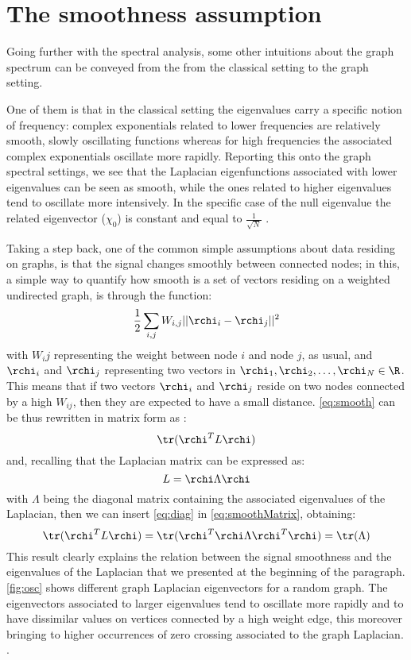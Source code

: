 \chapter{The smoothness assumption}
Going further with the spectral analysis, some other intuitions about the graph spectrum can be conveyed from the from the classical setting to the graph setting.

One of them is that in the classical setting the eigenvalues carry a specific notion of frequency: complex exponentials related to lower frequencies are relatively smooth, slowly oscillating functions whereas for high frequencies the associated complex exponentials oscillate more rapidly. Reporting this onto the graph spectral settings, we see that the Laplacian eigenfunctions associated with lower eigenvalues can be seen as smooth, while the ones related to higher eigenvalues tend to oscillate more intensively. \cite{Shuman2016} In the specific case of the null eigenvalue  the related eigenvector ($\chi_0$) is constant and equal to $\frac{1}{\sqrt{N}}$ \cite{Shuman2013}.

Taking a step back, one of the common simple assumptions about data residing on graphs, is that the signal changes smoothly between connected nodes; in this, a simple way to quantify how smooth is a set of vectors residing on a weighted undirected graph, is through the function:
\begin{equation}
\frac{1}{2} \sum_{i,j}W_{i,j}||\rchi_i - \rchi_j||^2
\label{eq:smooth}
\end{equation}
with $W_ij$ representing the weight between node $i$ and node $j$, as usual, and $\rchi_i$ and $\rchi_j$ representing two vectors in $\rchi_1,\rchi_2,\dots,\rchi_N \in \R$. This means that if two vectors $\rchi_i$ and $\rchi_j$ reside on two nodes connected by a high $W_{ij}$, then they are expected to have a small distance. \autoref{eq:smooth} can be thus rewritten in matrix form as \cite{Kalofolias2016} :
\begin{equation}
\tr(\rchi^T L \rchi)
\label{eq:smoothMatrix}
\end{equation} and, recalling that the Laplacian matrix can be expressed as:
\begin{equation}
L = \rchi \Lambda  \rchi
\label{eq:diag}
\end{equation}
with $\Lambda$ being the diagonal matrix containing the associated eigenvalues of the Laplacian, then we can insert \ref{eq:diag} in \ref{eq:smoothMatrix}, obtaining:
\begin{equation}
\tr(\rchi^T L \rchi) = \tr(\rchi^T \rchi \Lambda \rchi^T \rchi) = \tr(\Lambda)
\end{equation}
This result clearly explains the relation between the signal smoothness and the eigenvalues of the Laplacian that we presented at the beginning of the paragraph. \autoref{fig:osc} shows different graph Laplacian eigenvectors for a random graph. The eigenvectors associated to larger eigenvalues tend to oscillate more rapidly and to have dissimilar values on vertices connected by a high weight edge, this moreover bringing to higher occurrences of zero crossing associated to the graph Laplacian. \cite{Shuman2013}.

